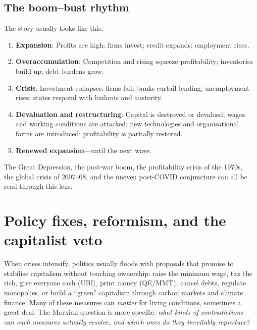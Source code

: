 \subsection{The boom–bust rhythm}

The story usually looks like this:

\begin{enumerate}[leftmargin=1.5em]
  \item \textbf{Expansion}: Profits are high; firms invest; credit expands;
  employment rises.

  \item \textbf{Overaccumulation}: Competition and rising \OCC{} squeeze
  profitability; inventories build up; debt burdens grow.

  \item \textbf{Crisis}: Investment collapses; firms fail; banks curtail
  lending; unemployment rises; states respond with bailouts and austerity.

  \item \textbf{Devaluation and restructuring}: Capital is destroyed or
  devalued; wages and working conditions are attacked; new technologies and
  organisational forms are introduced; profitability is partially restored.

  \item \textbf{Renewed expansion}---until the next wave.
\end{enumerate}

The Great Depression, the post-war boom, the profitability crisis of the
1970s, the global crisis of 2007--08, and the uneven post-COVID conjuncture
can all be read through this lens.\cite{Roberts2016,HarveyCompanion}



\section{Policy fixes, reformism, and the capitalist veto}
\label{sec:policy-fixes-veto}

When crises intensify, politics usually floods with proposals that promise to stabilise capitalism without
touching ownership: raise the minimum wage, tax the rich, give everyone cash (UBI), print money (QE/MMT),
cancel debts, regulate monopolies, or build a ``green'' capitalism through carbon markets and climate finance.
Many of these measures can \emph{matter} for living conditions, sometimes a great deal. The Marxian question is
more specific: \emph{what kinds of contradictions can such measures actually resolve, and which ones do they
inevitably reproduce?}


